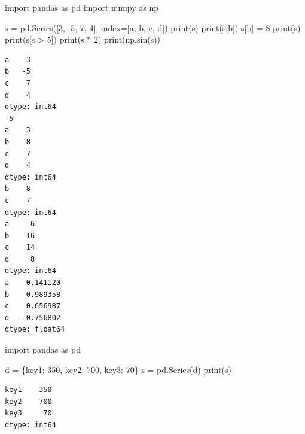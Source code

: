 \documentclass[
  polish,
  letterpaper,
  DIV=11,
  numbers=noendperiod]{scrreprt}
\newenvironment{Shaded}{\begin{snugshade}}{\end{snugshade}}
\newcommand{\BuiltInTok}[1]{\textcolor[rgb]{0.00,0.23,0.31}{#1}}
\newcommand{\DecValTok}[1]{\textcolor[rgb]{0.68,0.00,0.00}{#1}}
\newcommand{\ImportTok}[1]{\textcolor[rgb]{0.00,0.46,0.62}{#1}}
\newcommand{\NormalTok}[1]{\textcolor[rgb]{0.00,0.23,0.31}{#1}}
\newcommand{\OperatorTok}[1]{\textcolor[rgb]{0.37,0.37,0.37}{#1}}
\newcommand{\StringTok}[1]{\textcolor[rgb]{0.13,0.47,0.30}{#1}}
\begin{document}
\begin{Shaded}
\begin{Highlighting}[]
\ImportTok{import}\NormalTok{ pandas }\ImportTok{as}\NormalTok{ pd}
\ImportTok{import}\NormalTok{ numpy }\ImportTok{as}\NormalTok{ np}

\NormalTok{s }\OperatorTok{=}\NormalTok{ pd.Series([}\DecValTok{3}\NormalTok{, }\OperatorTok{{-}}\DecValTok{5}\NormalTok{, }\DecValTok{7}\NormalTok{, }\DecValTok{4}\NormalTok{], index}\OperatorTok{=}\NormalTok{[}\StringTok{\textquotesingle{}a\textquotesingle{}}\NormalTok{, }\StringTok{\textquotesingle{}b\textquotesingle{}}\NormalTok{, }\StringTok{\textquotesingle{}c\textquotesingle{}}\NormalTok{, }\StringTok{\textquotesingle{}d\textquotesingle{}}\NormalTok{])}
\BuiltInTok{print}\NormalTok{(s)}
\BuiltInTok{print}\NormalTok{(s[}\StringTok{\textquotesingle{}b\textquotesingle{}}\NormalTok{])}
\NormalTok{s[}\StringTok{\textquotesingle{}b\textquotesingle{}}\NormalTok{] }\OperatorTok{=} \DecValTok{8}
\BuiltInTok{print}\NormalTok{(s)}
\BuiltInTok{print}\NormalTok{(s[s }\OperatorTok{\textgreater{}} \DecValTok{5}\NormalTok{])}
\BuiltInTok{print}\NormalTok{(s }\OperatorTok{*} \DecValTok{2}\NormalTok{)}
\BuiltInTok{print}\NormalTok{(np.sin(s))}
\end{Highlighting}
\end{Shaded}

\begin{verbatim}
a    3
b   -5
c    7
d    4
dtype: int64
-5
a    3
b    8
c    7
d    4
dtype: int64
b    8
c    7
dtype: int64
a     6
b    16
c    14
d     8
dtype: int64
a    0.141120
b    0.989358
c    0.656987
d   -0.756802
dtype: float64
\end{verbatim}

\begin{Shaded}
\begin{Highlighting}[]
\ImportTok{import}\NormalTok{ pandas }\ImportTok{as}\NormalTok{ pd}

\NormalTok{d }\OperatorTok{=}\NormalTok{ \{}\StringTok{\textquotesingle{}key1\textquotesingle{}}\NormalTok{: }\DecValTok{350}\NormalTok{, }\StringTok{\textquotesingle{}key2\textquotesingle{}}\NormalTok{: }\DecValTok{700}\NormalTok{, }\StringTok{\textquotesingle{}key3\textquotesingle{}}\NormalTok{: }\DecValTok{70}\NormalTok{\}}
\NormalTok{s }\OperatorTok{=}\NormalTok{ pd.Series(d)}
\BuiltInTok{print}\NormalTok{(s)}
\end{Highlighting}
\end{Shaded}

\begin{verbatim}
key1    350
key2    700
key3     70
dtype: int64
\end{verbatim}
\end{document}
